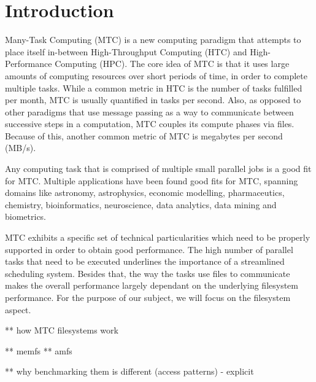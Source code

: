 
\chapter{Introduction} %

\label{Chapter1} %



Many-Task Computing (MTC)\cite{mtc} is a new computing paradigm that attempts to place itself in-between High-Throughput Computing (HTC) and High-Performance Computing (HPC). The core idea of MTC is that it uses large amounts of computing resources over short periods of time, in order to complete multiple tasks. While a common metric in HTC is the number of tasks fulfilled per month, MTC is usually quantified in tasks per second. Also, as opposed to other paradigms that use message passing as a way to communicate between successive steps in a computation, MTC couples its compute phases via files. Because of this, another common metric of MTC is megabytes per second (MB/s).

Any computing task that is comprised of multiple small parallel jobs is a good fit for MTC. Multiple applications have been found good fits for MTC\cite{mtc}, spanning domains like astronomy, astrophysics, economic modelling, pharmaceutics, chemistry, bioinformatics, neuroscience, data analytics, data mining and biometrics.

MTC exhibits a specific set of technical particularities which need to be properly supported in order to obtain good performance. The high number of parallel tasks that need to be executed underlines the importance of a streamlined scheduling system. Besides that, the way the tasks use files to communicate makes the overall performance largely dependant on the underlying filesystem performance. For the purpose of our subject, we will focus on the filesystem aspect.


** how MTC filesystems work

** memfs
** amfs

** why benchmarking them is different (access patterns) - explicit